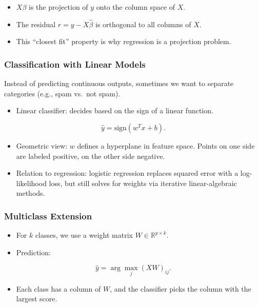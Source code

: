 \documentclass[
  letterpaper,
  DIV=11,
  numbers=noendperiod]{scrreprt}
\providecommand{\tightlist}{%
  \setlength{\itemsep}{0pt}\setlength{\parskip}{0pt}}
\begin{document}
\begin{itemize}
\tightlist
\item
  \(X\beta\) is the projection of \(y\) onto the column space of \(X\).
\item
  The residual \(r = y - X\hat{\beta}\) is orthogonal to all columns of
  \(X\).
\item
  This ``closest fit'' property is why regression is a projection
  problem.
\end{itemize}

\subsubsection{Classification with Linear
Models}\label{classification-with-linear-models}

Instead of predicting continuous outputs, sometimes we want to separate
categories (e.g., spam vs.~not spam).

\begin{itemize}
\tightlist
\item
  Linear classifier: decides based on the sign of a linear function.
\end{itemize}

\[
\hat{y} = \text{sign}(w^T x + b).
\]

\begin{itemize}
\tightlist
\item
  Geometric view: \(w\) defines a hyperplane in feature space. Points on
  one side are labeled positive, on the other side negative.
\item
  Relation to regression: logistic regression replaces squared error
  with a log-likelihood loss, but still solves for weights via iterative
  linear-algebraic methods.
\end{itemize}

\subsubsection{Multiclass Extension}\label{multiclass-extension}

\begin{itemize}
\tightlist
\item
  For \(k\) classes, we use a weight matrix
  \(W \in \mathbb{R}^{p \times k}\).
\item
  Prediction:
\end{itemize}

\[
\hat{y} = \arg \max_j (XW)_{ij}.
\]

\begin{itemize}
\tightlist
\item
  Each class has a column of \(W\), and the classifier picks the column
  with the largest score.
\end{itemize}
\end{document}
